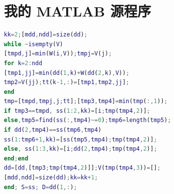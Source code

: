 \documentclass[bwprint]{gmcmthesis}
\begin{document}




\newpage
\appendix
\section{我的 MATLAB 源程序}
\begin{lstlisting}[language=Matlab]%设置不同语言即可。
kk=2;[mdd,ndd]=size(dd);
while ~isempty(V)
[tmpd,j]=min(W(i,V));tmpj=V(j);
for k=2:ndd
[tmp1,jj]=min(dd(1,k)+W(dd(2,k),V));
tmp2=V(jj);tt(k-1,:)=[tmp1,tmp2,jj];
end
tmp=[tmpd,tmpj,j;tt];[tmp3,tmp4]=min(tmp(:,1));
if tmp3==tmpd, ss(1:2,kk)=[i;tmp(tmp4,2)];
else,tmp5=find(ss(:,tmp4)~=0);tmp6=length(tmp5);
if dd(2,tmp4)==ss(tmp6,tmp4)
ss(1:tmp6+1,kk)=[ss(tmp5,tmp4);tmp(tmp4,2)];
else, ss(1:3,kk)=[i;dd(2,tmp4);tmp(tmp4,2)];
end;end
dd=[dd,[tmp3;tmp(tmp4,2)]];V(tmp(tmp4,3))=[];
[mdd,ndd]=size(dd);kk=kk+1;
end; S=ss; D=dd(1,:);


 \end{lstlisting}
\end{document}
